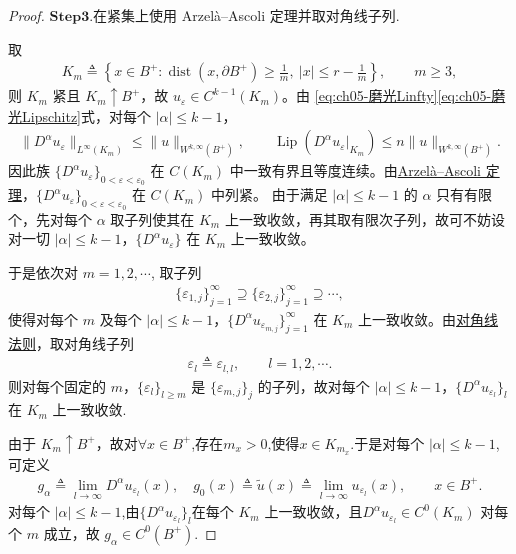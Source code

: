 \documentclass[../../main.tex]{subfiles}
\begin{document}
\begin{proof}
\noindent$\mathbf{Step}\bm{3}$.{\heiti 在紧集上使用 Arzel\`a--Ascoli 定理并取对角线子列.}

取
\begin{align*}
K_m\triangleq\left\{x\in B^{+}:\operatorname{dist}(x,\partial B^{+})\geqslant\frac{1}{m},\ |x|\leqslant r-\frac{1}{m}\right\},\qquad m\geqslant3,
\end{align*}
则 $K_m$ 紧且 $K_m\uparrow B^{+}$，故 $u_{\varepsilon}\in C^{k-1}(K_m)$。由 \eqref{eq:ch05-磨光Linfty}\eqref{eq:ch05-磨光Lipschitz}式，对每个 $|\alpha|\leqslant k-1$，
\begin{align*}
\|D^{\alpha}u_{\varepsilon}\|_{L^{\infty}(K_m)}\leqslant\|u\|_{W^{k,\infty}(B^{+})},\qquad
\operatorname{Lip}(D^{\alpha}u_{\varepsilon}|_{K_m})\leqslant n\|u\|_{W^{k,\infty}(B^{+})}.
\end{align*}
因此族 $\{D^{\alpha}u_{\varepsilon}\}_{0<\varepsilon<\varepsilon_0}$ 在 $C(K_m)$ 中一致有界且等度连续。由\hyperref[Functional Analysis-theorem:泛函分析--Arzelà-Ascoli定理]{Arzel\`a--Ascoli 定理}，$\{D^{\alpha}u_{\varepsilon}\}_{0<\varepsilon<\varepsilon_0}$ 在 $C(K_m)$ 中列紧。
由于满足 $|\alpha|\leqslant k-1$ 的 $\alpha$ 只有有限个，先对每个 $\alpha$ 取子列使其在 $K_m$ 上一致收敛，再其取有限次子列，故可不妨设对一切 $|\alpha|\leqslant k-1$，$\{D^{\alpha}u_{\varepsilon}\}$ 在 $K_m$ 上一致收敛。

于是依次对 $m=1,2,\cdots$, 取子列
\begin{align*}
\{\varepsilon_{1,j}\}_{j=1}^{\infty}\supseteq\{\varepsilon_{2,j}\}_{j=1}^{\infty}\supseteq\cdots,
\end{align*}
使得对每个 $m$ 及每个 $|\alpha|\leqslant k-1$，$\{D^{\alpha}u_{\varepsilon_{m,j}}\}_{j=1}^{\infty}$ 在 $K_m$ 上一致收敛。由\hyperref[Functional Analysis-proposition:对角线法则]{对角线法则}，取对角线子列
\begin{align*}
\varepsilon_l\triangleq\varepsilon_{l,l},\qquad l=1,2,\cdots.
\end{align*}
则对每个固定的 $m$，$\{\varepsilon_l\}_{l\geqslant m}$ 是 $\{\varepsilon_{m,j}\}_{j}$ 的子列，故对每个 $|\alpha|\leqslant k-1$，$\{D^{\alpha}u_{\varepsilon_l}\}_{l}$ 在 $K_m$ 上一致收敛.

由于 $K_m\uparrow B^{+}$，故对$\forall x\in B^+$,存在$m_x>0$,使得$x\in K_{m_x}$.于是对每个 $|\alpha|\leqslant k-1$,可定义
\begin{align}
g_{\alpha}\triangleq \lim_{l\to\infty}D^{\alpha}u_{\varepsilon_l}(x),\quad g_0(x)\triangleq \widetilde{u}(x)\triangleq\lim_{l\to\infty}u_{\varepsilon_l}(x),\qquad x\in B^{+}.
\label{eq:ch05-极限函数}
\end{align}
对每个 $|\alpha|\leqslant k-1$,由$\{D^{\alpha}u_{\varepsilon_l}\}_{l}$在每个 $K_m$ 上一致收敛，且$D^{\alpha}u_{\varepsilon_l}\in C^{0}(K_m)$ 对每个 $m$ 成立，故 $g_{\alpha}\in C^{0}(B^{+})$.


\end{proof}
\end{document}
